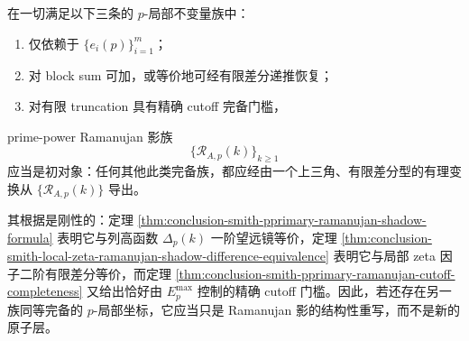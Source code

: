 \begin{conjecture}\label{conj:conclusion-smith-ramanujan-shadow-initiality}
在一切满足以下三条的 \(p\)-局部不变量族中：
\begin{enumerate}
\normalfont
  \item 仅依赖于 \(\{e_i(p)\}_{i=1}^{m}\)；
  \item 对 block sum 可加，或等价地可经有限差分递推恢复；
  \item 对有限 truncation 具有精确 cutoff 完备门槛，
\end{enumerate}
prime-power Ramanujan 影族
\[
\{\mathcal R_{A,p}(k)\}_{k\ge 1}
\]
应当是初对象：任何其他此类完备族，都应经由一个上三角、有限差分型的有理变换从 \(\{\mathcal R_{A,p}(k)\}\) 导出。

其根据是刚性的：定理 \ref{thm:conclusion-smith-pprimary-ramanujan-shadow-formula} 表明它与列高函数 \(\Delta_p(k)\) 一阶望远镜等价，定理 \ref{thm:conclusion-smith-local-zeta-ramanujan-shadow-difference-equivalence} 表明它与局部 zeta 因子二阶有限差分等价，而定理 \ref{thm:conclusion-smith-pprimary-ramanujan-cutoff-completeness} 又给出恰好由 \(E_p^{\max}\) 控制的精确 cutoff 门槛。因此，若还存在另一族同等完备的 \(p\)-局部坐标，它应当只是 Ramanujan 影的结构性重写，而不是新的原子层。
\end{conjecture}
